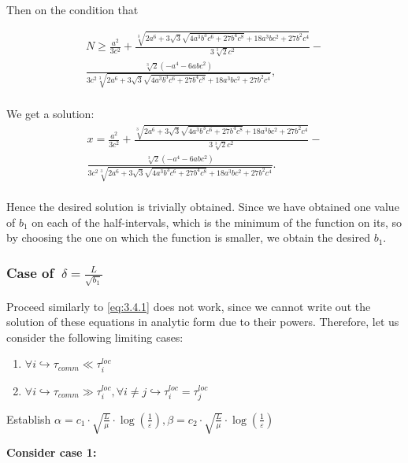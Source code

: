 \documentclass{article}
\begin{document}
Then on the condition that 

\begin{gather*}
    N \geq \frac{a^2}{3 c^2}+\frac{\sqrt[3]{2 a^6+3 \sqrt{3} \sqrt{4 a^3 b^3 c^6+27 b^4 c^8}+18 a^3 b c^2+27 b^2 c^4}}{3 \sqrt[3]{2} c^2}-  \\
    \frac{\sqrt[3]{2}\left(-a^4-6 a b c^2\right) } 
    {3 c^2 \sqrt[3]{2 a^6+3 \sqrt{3} \sqrt{4 a^3 b^3 c^6+27 b^4 c^8}+18 a^3 b c^2+27 b^2 c^4}}, \\
\end{gather*}

We get a solution: \\

\begin{gather*}
     x=\frac{a^2}{3 c^2}+\frac{\sqrt[3]{2 a^6+3 \sqrt{3} \sqrt{4 a^3 b^3 c^6+27 b^4 c^8}+18 a^3 b c^2+27 b^2 c^4}}{3 \sqrt[3]{2} c^2}- \\ \frac{\sqrt[3]{2}\left(-a^4-6 a b c^2\right)} 
    {3 c^2 \sqrt[3]{2 a^6+3 \sqrt{3} \sqrt{4 a^3 b^3 c^6+27 b^4 c^8}+18 a^3 b c^2+27 b^2 c^4}}.  \\
\end{gather*}

Hence the desired solution is trivially obtained. Since we have obtained one value of $b_1$ on each of the half-intervals, which is the minimum of the function on its, so by choosing the one on which the function is smaller, we obtain the desired $b_1$.

\subsubsection{Case of $~\delta = \frac{L}{\sqrt{b_1}}$}\label{eq:3.4.2}
Proceed similarly to \ref{eq:3.4.1} does not work, since we cannot write out the solution of these equations in analytic form due to their powers.
Therefore, let us consider the following limiting cases:
\begin{enumerate}
    \item $\forall i\hookrightarrow \tau_{comm} \ll \tau_i^{loc}$
    \item $\forall i\hookrightarrow \tau_{comm} \gg \tau_i^{loc}, \forall i\neq j\hookrightarrow \tau_i^{loc} = \tau_j^{loc}$
\end{enumerate}

Establish $\alpha = c_1\cdot\sqrt{\frac{L}{\mu}}\cdot \log(\frac{1}{\varepsilon}),\beta = c_2\cdot\sqrt{\frac{L}{\mu}}\cdot \log(\frac{1}{\varepsilon}) $

\textbf{Consider case 1:}
\end{document}
